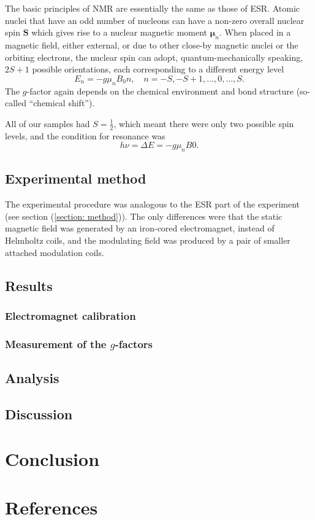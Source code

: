 \documentclass[a4paper]{jpconf}
\numberwithin{equation}{section}
\begin{document}
The basic principles of NMR are essentially the same as those of ESR. Atomic nuclei that have an odd number of nucleons can have a non-zero overall nuclear spin $\mathbf{S}$ which gives rise to a nuclear magnetic moment $\bm{\mu}_n$. When placed in a magnetic field, either external, or due to other close-by magnetic nuclei or the orbiting electrons, the nuclear spin can adopt, quantum-mechanically speaking, $2S + 1$ possible orientations, each corresponding to a different energy level
\[
	E_n = -g \mu_n B_0 n, \quad n = -S, -S+1, \dots, 0, \dots, S. 
\] 
The $g$-factor again depends on the chemical environment and bond structure (so-called ``chemical shift''). 

All of our samples had $S = \tfrac{1}{2}$, which meant there were only two possible spin levels, and the condition for resonance was 
\begin{equation}\label{eqn: NMR resonance condition}
	h\nu = \Delta E = -g \mu_n B0.
\end{equation}


\subsection{Experimental method}
The experimental procedure was analogous to the ESR part of the experiment (see section (\ref{section: method})). The only differences were that the static magnetic field was generated by an iron-cored electromagnet, instead of Helmholtz coils, and the modulating field was produced by a pair of smaller attached modulation coils.


\subsection{Results}
\subsubsection{Electromagnet calibration}
\subsubsection{Measurement of the $g$-factors}
\subsection{Analysis}

\subsection{Discussion}

\section{Conclusion}

\section*{References}
\begin{thebibliography}{9}
\end{thebibliography}
\end{document}
